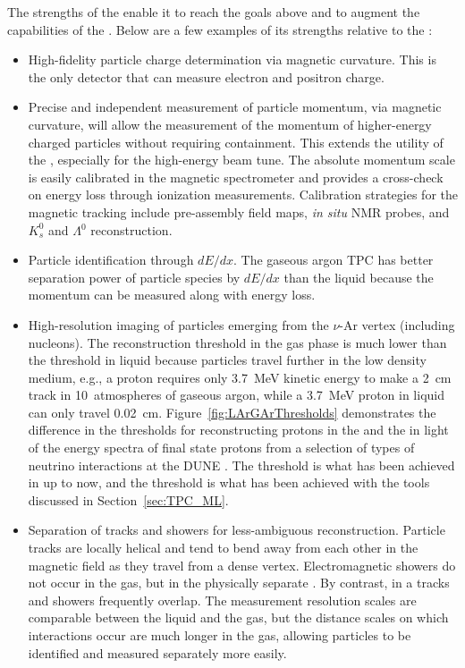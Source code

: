 The strengths of the  enable it to reach the goals above and to augment the capabilities of the . Below are a few examples of its strengths relative to the :
\begin{itemize}
     \item High-fidelity particle charge determination via magnetic curvature. This is the only detector that can measure electron and positron charge.
     
     \item Precise and independent measurement of particle momentum, via magnetic curvature, will allow the measurement of the momentum of higher-energy charged particles without requiring containment. This extends the utility of the  , especially for the high-energy beam tune. The absolute momentum scale is easily calibrated in the magnetic spectrometer and provides a cross-check on energy loss through ionization measurements.  Calibration strategies for the magnetic tracking include pre-assembly field maps, {\it in situ} NMR probes, and $K^0_s$ and $\Lambda\!^0$ reconstruction.
     
      \item Particle identification through $dE/dx$. The gaseous argon TPC has better separation power of particle species by $dE/dx$ than the liquid because the momentum can be measured along with energy loss. 
      
      \item High-resolution imaging of particles emerging from the $\nu$-Ar vertex (including nucleons).  The reconstruction threshold in the gas phase is much lower than the threshold in liquid because particles travel further in the low density medium, e.g., a proton requires only \SI{3.7}{MeV} kinetic energy to make a \SI{2}{cm} track in 10~atmospheres of gaseous argon, while a \SI{3.7}{MeV} proton in liquid can only travel \SI{0.02}{cm}. Figure~\ref{fig:LArGArThresholds} demonstrates the difference in the thresholds for reconstructing protons in the  and the  in light of the energy spectra of final state protons from a selection of types of neutrino interactions at the DUNE . The  threshold is what has been achieved in  up to now, and the  threshold is what has been achieved with the tools discussed in Section~\ref{sec:TPC_ML}.
   
   
    \item Separation of tracks and showers for less-ambiguous reconstruction.  Particle tracks are locally helical and tend to bend away from each other in the magnetic field as they travel from a dense vertex.  Electromagnetic showers do not occur in the gas, but in the physically separate .  By contrast, in a  tracks and showers frequently overlap.  The measurement resolution scales are comparable between the liquid and the gas, but the distance scales on which interactions occur are much longer in the gas, allowing particles to be identified and measured separately more easily.
   

\end{itemize}
